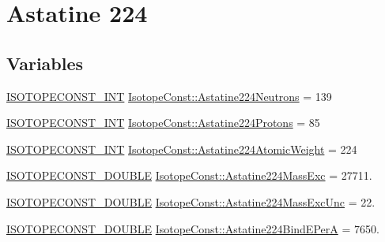 \hypertarget{group___isotope_const-_astatine-_at224}{}\section{Astatine 224}
\label{group___isotope_const-_astatine-_at224}
\subsection*{Variables}
\begin{DoxyCompactItemize}
\item 
\mbox{\hyperlink{group___isotope_const-_macros_ga5f18360b3e99483a35c32d789e62621c}{I\+S\+O\+T\+O\+P\+E\+C\+O\+N\+S\+T\+\_\+\+I\+NT}} \mbox{\hyperlink{group___isotope_const-_astatine-_at224_gab86afc833d698c6f1851e625d5846c3a}{Isotope\+Const\+::\+Astatine224\+Neutrons}} = 139
\item 
\mbox{\hyperlink{group___isotope_const-_macros_ga5f18360b3e99483a35c32d789e62621c}{I\+S\+O\+T\+O\+P\+E\+C\+O\+N\+S\+T\+\_\+\+I\+NT}} \mbox{\hyperlink{group___isotope_const-_astatine-_at224_ga258ffdb50d63d3e58e8278f43869aa1e}{Isotope\+Const\+::\+Astatine224\+Protons}} = 85
\item 
\mbox{\hyperlink{group___isotope_const-_macros_ga5f18360b3e99483a35c32d789e62621c}{I\+S\+O\+T\+O\+P\+E\+C\+O\+N\+S\+T\+\_\+\+I\+NT}} \mbox{\hyperlink{group___isotope_const-_astatine-_at224_ga9b63b09fdfa406f96b96138b6e7f90fa}{Isotope\+Const\+::\+Astatine224\+Atomic\+Weight}} = 224
\item 
\mbox{\hyperlink{group___isotope_const-_macros_ga8f45a7272ce02c0b4c65c44636ed719a}{I\+S\+O\+T\+O\+P\+E\+C\+O\+N\+S\+T\+\_\+\+D\+O\+U\+B\+LE}} \mbox{\hyperlink{group___isotope_const-_astatine-_at224_gad6c414c2dffd6de7d9db72f41e28897a}{Isotope\+Const\+::\+Astatine224\+Mass\+Exc}} = 27711.
\item 
\mbox{\hyperlink{group___isotope_const-_macros_ga8f45a7272ce02c0b4c65c44636ed719a}{I\+S\+O\+T\+O\+P\+E\+C\+O\+N\+S\+T\+\_\+\+D\+O\+U\+B\+LE}} \mbox{\hyperlink{group___isotope_const-_astatine-_at224_ga0f40a90be22d0a727a23fdc089c11162}{Isotope\+Const\+::\+Astatine224\+Mass\+Exc\+Unc}} = 22.
\item 
\mbox{\hyperlink{group___isotope_const-_macros_ga8f45a7272ce02c0b4c65c44636ed719a}{I\+S\+O\+T\+O\+P\+E\+C\+O\+N\+S\+T\+\_\+\+D\+O\+U\+B\+LE}} \mbox{\hyperlink{group___isotope_const-_astatine-_at224_ga32635e78cefebc0f103b22a924719570}{Isotope\+Const\+::\+Astatine224\+Bind\+E\+PerA}} = 7650.
\item 

\end{DoxyCompactItemize}
